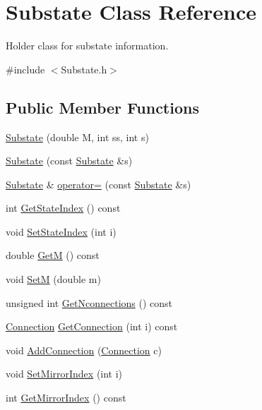 \hypertarget{classSubstate}{\section{Substate Class Reference}
\label{classSubstate}
}


Holder class for substate information.  




{\ttfamily \#include $<$Substate.\-h$>$}

\subsection*{Public Member Functions}
\begin{DoxyCompactItemize}
\item 
\hyperlink{classSubstate_adc55a0114f54fd9e2e0b284e77177077}{Substate} (double M, int ss, int s)
\item 
\hyperlink{classSubstate_a094e9816b8d0e1ca8a925060aa666a10}{Substate} (const \hyperlink{classSubstate}{Substate} \&s)
\item 
\hyperlink{classSubstate}{Substate} \& \hyperlink{classSubstate_a1fdb1a8a82baf2d03f42a1b7ce37421d}{operator=} (const \hyperlink{classSubstate}{Substate} \&s)
\item 
int \hyperlink{classSubstate_abb2e99735df6a7f342236b08d6845f19}{Get\-State\-Index} () const 
\item 
void \hyperlink{classSubstate_ae5dc83066f50c796155954d7f9c3c1b8}{Set\-State\-Index} (int i)
\item 
double \hyperlink{classSubstate_aa24ecbfaab39eeeb1bbefeb833031930}{Get\-M} () const 
\item 
void \hyperlink{classSubstate_ab36c3c3b2a3862f67d8f0ca69c79b625}{Set\-M} (double m)
\item 
unsigned int \hyperlink{classSubstate_a720d7bdf9c506bde448c9dd68eaa2914}{Get\-Nconnections} () const 
\item 
\hyperlink{classConnection}{Connection} \hyperlink{classSubstate_af5850558a667f170661f5fcb7bcc9f28}{Get\-Connection} (int i) const 
\item 
void \hyperlink{classSubstate_a14f86d11fdf7540b3a6efd5006900cea}{Add\-Connection} (\hyperlink{classConnection}{Connection} c)
\item 
void \hyperlink{classSubstate_ad4b6a12d9cbb52240ad6b48f80564c46}{Set\-Mirror\-Index} (int i)
\item 
int \hyperlink{classSubstate_aeb9299af9f8c4ba676a223dc6c7ca9eb}{Get\-Mirror\-Index} () const 
\end{DoxyCompactItemize}



